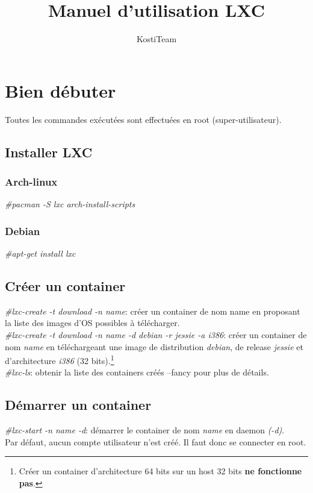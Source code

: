 \documentclass{article}
\author{KostiTeam}
\title{Manuel d'utilisation LXC}
\begin{document}
\maketitle
\newpage
\tableofcontents
\newpage

\section{Bien d\'ebuter}
Toutes les commandes ex\'ecut\'ees sont effectu\'ees en root (super-utilisateur).

\subsection{Installer LXC}
\subsubsection{Arch-linux}
\emph{\#pacman -S lxc arch-install-scripts}
\subsubsection{Debian}
\emph{\#apt-get install lxc}

\subsection{Cr\'eer un container}
\emph{\#lxc-create -t download -n name}: cr\'eer un container de nom name en proposant la liste des images d'OS possibles \`a t\'el\'echarger.\\ 

\emph{\#lxc-create -t download -n name -d debian -r jessie -a i386}: cr\'eer un container de nom \emph{name} en t\'el\'echargeant une image de distribution \emph{debian}, de release \emph{jessie} et d'architecture \emph{i386} (32 bits).\footnote{Cr\'eer un container d'architecture 64 bits sur un host 32 bits \textbf{ne fonctionne pas}.}\\

\emph{\#lxc-ls}: obtenir la liste des containers cr\'e\'es --fancy pour plus de d\'etails.\\
  
\subsection{D\'emarrer un container}
\emph{\#lxc-start -n name  -d}: d\'emarrer le container de nom \emph{name} en daemon \emph{(-d)}.\\
Par d\'efaut, aucun compte utilisateur n'est cr\'e\'e. Il faut donc se connecter en root.\\ 
\end{document}
